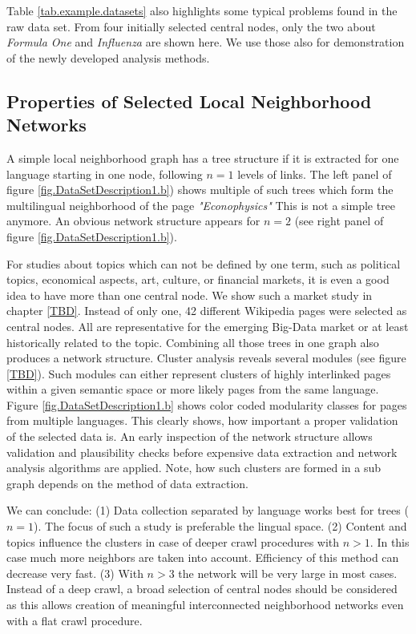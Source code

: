 \documentclass[a4paper,10pt]{scrbook}
\begin{document}
Table \ref{tab.example.datasets} also highlights some typical problems found in the raw data set. From four initially selected central nodes, only the two about \textit{Formula One} and \textit{Influenza} are shown here. We use those also for demonstration of the newly developed analysis methods. 

\subsection{Properties of Selected Local Neighborhood Networks}
A simple local neighborhood graph has a tree structure if it is extracted for one language starting in one node, following $n=1$ levels of links. The left panel of figure  \ref{fig.DataSetDescription1.b}) shows multiple of such trees which form the multilingual neighborhood of the page \textit{"Econophysics"} This is not a simple tree anymore. An obvious network structure appears for $n=2$ (see right panel of figure \ref{fig.DataSetDescription1.b}).

%
%
%
For studies about topics which can not be defined by one term, such as political topics, economical aspects, art, culture, or financial markets, it is even a good idea to have more than one central node. We show such a market study in chapter \ref{TBD}. 
Instead of only one, 42 different Wikipedia pages were selected as central nodes. All are representative for the emerging Big-Data market or at least historically related to the topic. Combining all those trees in one graph also produces a network structure. Cluster analysis reveals several modules (see figure \ref{TBD}). 
Such modules can either represent clusters of highly interlinked pages within a given semantic space or more likely pages from the same language. Figure \ref{fig.DataSetDescription1.b} shows color coded modularity classes for pages from multiple languages. This clearly shows, how important a proper validation of the selected data is. An early inspection of the network structure allows validation and plausibility checks before expensive data extraction and network analysis algorithms are applied. 
Note, how such clusters are formed in a sub graph depends on the method of data extraction. 

We can conclude: (1) Data collection separated by language works best for trees ($n=1$). The focus of such a study is preferable the lingual space. (2) Content and topics influence the clusters in case of deeper crawl procedures with $n>1$. In this case much more neighbors are taken into account. Efficiency of this method can decrease very fast. (3) With $n>3$ the network will be very large in most cases. Instead of a deep crawl, a broad selection of central nodes should be considered as this allows creation of meaningful interconnected neighborhood networks even with a flat crawl procedure.
\end{document}
